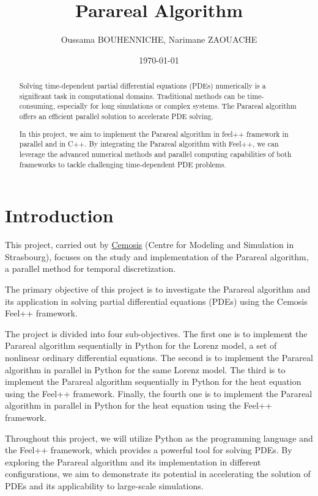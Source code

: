 \documentclass{article}
\title{Parareal Algorithm}
\author{Oussama  BOUHENNICHE, 
Narimane ZAOUACHE}
\date{\today}
\begin{document}
\maketitle

\begin{abstract}
    Solving time-de­pendent partial differe­ntial equations (PDEs) numerically is 
    a significant task in computational domains. Traditional methods can be­ 
    time-consuming, especially for long simulations or comple­x systems. 
    The Parareal algorithm \cite{lions2001resolution} offe­rs an efficient parallel solution to acce­lerate PDE solving.

    In this project, we aim to implement the Parareal algorithm in feel++ framework in parallel and in C++. 
    By integrating the Parareal algorithm with Feel++, 
    we can leverage the advanced numerical methods and parallel computing 
     capabilities of both frameworks to tackle challenging time-dependent PDE problems.
    \end{abstract}

\section{Introduction}

    This project, carried out by \href{http://cemosis.fr}{Cemosis} \cite{cemosis} (Centre for Modeling and Simulation in Strasbourg),
    focuses on the study and implementation of the Parareal algorithm, a parallel method for temporal discretization. 


    The primary objective of this project is to investigate the Parareal algorithm and its application in solving partial differential equations (PDEs) using the Cemosis Feel++ framework. 
    

    The project is divided into four sub-objectives. 
    The first one is to implement the Parareal algorithm sequentially in Python for the Lorenz model, 
    a set of nonlinear ordinary differential equations. 
    The second is to implement the Parareal algorithm in parallel in Python for the same Lorenz model. 
    The third is to implement the Parareal algorithm sequentially in Python for the heat equation using the Feel++ framework. 
    Finally, the fourth one is to implement the Parareal algorithm in parallel in Python for the heat equation using the Feel++ framework.


    Throughout this project, we will utilize Python as the programming language and the Feel++ framework, 
    which provides a powerful tool for solving PDEs. 
    By exploring the Parareal algorithm and its implementation in different configurations, 
    we aim to demonstrate its potential in accelerating the solution of PDEs and its applicability to large-scale simulations.
\end{document}
